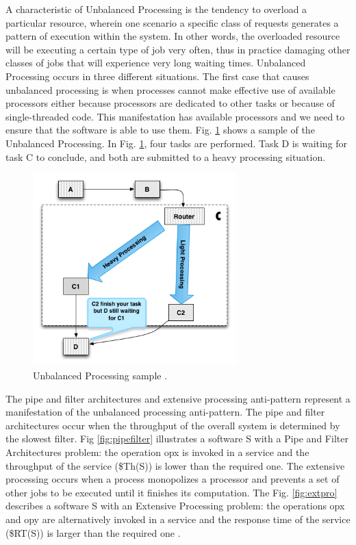 \documentclass[espaco=umemeio,chapter=TITLE,twoside,openright]{abnt}
\begin{document}
A characteristic of Unbalanced Processing is the tendency to overload a particular resource, wherein one scenario a specific class of requests generates a pattern of execution within the system. In other words, the overloaded resource will be executing a certain type of job very often, thus in practice damaging other classes
of jobs that will experience very long waiting times. Unbalanced Processing occurs in three different situations. The first case that causes unbalanced processing is when processes cannot make effective use of available processors either because processors are dedicated to other tasks or because of single-threaded code. This manifestation has available processors and we need to ensure that the software is able to use them. Fig. \ref{fig:unbalanced}  shows a sample of the Unbalanced Processing. In Fig. \ref{fig:unbalanced}, four tasks are performed. Task D is waiting for task C to conclude, and both are submitted to a heavy processing situation.

\begin{figure}[h]
\centering
\includegraphics[width=0.7\textwidth]{./images/unbalanced.png}
\caption{Unbalanced Processing sample \cite{Wert2013a}. }
\label{fig:unbalanced}
\end{figure}

The pipe and filter architectures  and extensive processing anti-pattern represent a manifestation of the unbalanced processing anti-pattern. The pipe and filter architectures occur when the throughput of the overall system is determined by the slowest filter. Fig \ref{fig:pipefilter} illustrates a software S with a Pipe and Filter Architectures problem:  the operation opx is invoked in a service  and the throughput of the service (\$Th(S)) is lower than the required one. The extensive processing occurs when a process monopolizes a processor and prevents a set of other jobs to be executed until it finishes its computation. The Fig. \ref{fig:extpro} describes a software S with an Extensive Processing problem: the operations opx and opy are alternatively invoked in a service and the response time of the service (\$RT(S)) is larger than the required one \cite{Vetoio2011}.
\end{document}
